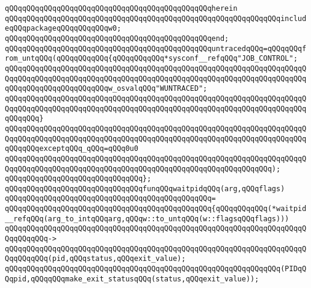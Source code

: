 \verb|qQQqqQQqqQQqqQQqqQQqqQQqqQQqqQQqqQQqqQQqqQQqqQQqherein|\newline
\verb|qQQqqQQqqQQqqQQqqQQqqQQqqQQqqQQqqQQqqQQqqQQqqQQqqQQqqQQqqQQqqQQqincludeqQQqpackageqQQqqQQqqQQqw0;|\newline
\verb|qQQqqQQqqQQqqQQqqQQqqQQqqQQqqQQqqQQqqQQqqQQqqQQqend;|\newline
\newline
\verb|qQQqqQQqqQQqqQQqqQQqqQQqqQQqqQQqqQQqqQQqqQQqqQQquntracedqQQq=qQQqqQQqfrom_untqQQq(qQQqqQQqqQQq{qQQqqQQqqQQq*sysconf__refqQQq"JOB_CONTROL";|\newline
\verb|qQQqqQQqqQQqqQQqqQQqqQQqqQQqqQQqqQQqqQQqqQQqqQQqqQQqqQQqqQQqqQQqqQQqqQQqqQQqqQQqqQQqqQQqqQQqqQQqqQQqqQQqqQQqqQQqqQQqqQQqqQQqqQQqqQQqqQQqqQQqqQQqqQQqqQQqqQQqqQQqqQQqw_osvalqQQq"WUNTRACED";|\newline
\verb|qQQqqQQqqQQqqQQqqQQqqQQqqQQqqQQqqQQqqQQqqQQqqQQqqQQqqQQqqQQqqQQqqQQqqQQqqQQqqQQqqQQqqQQqqQQqqQQqqQQqqQQqqQQqqQQqqQQqqQQqqQQqqQQqqQQqqQQqqQQqqQQqqQQq}|\newline
\verb|qQQqqQQqqQQqqQQqqQQqqQQqqQQqqQQqqQQqqQQqqQQqqQQqqQQqqQQqqQQqqQQqqQQqqQQqqQQqqQQqqQQqqQQqqQQqqQQqqQQqqQQqqQQqqQQqqQQqqQQqqQQqqQQqqQQqqQQqqQQqqQQqqQQqexceptqQQq_qQQq=qQQq0u0|\newline
\verb|qQQqqQQqqQQqqQQqqQQqqQQqqQQqqQQqqQQqqQQqqQQqqQQqqQQqqQQqqQQqqQQqqQQqqQQqqQQqqQQqqQQqqQQqqQQqqQQqqQQqqQQqqQQqqQQqqQQqqQQqqQQqqQQqqQQq);|\newline
\verb|qQQqqQQqqQQqqQQqqQQqqQQqqQQqqQQq};|\newline
\newline
\newline
\verb|qQQqqQQqqQQqqQQqqQQqqQQqqQQqqQQqfunqQQqwaitpidqQQq(arg,qQQqflags)|\newline
\verb|qQQqqQQqqQQqqQQqqQQqqQQqqQQqqQQqqQQqqQQqqQQqqQQq=|\newline
\verb|qQQqqQQqqQQqqQQqqQQqqQQqqQQqqQQqqQQqqQQqqQQqqQQq{qQQqqQQqqQQq(*waitpid__refqQQq(arg_to_intqQQqarg,qQQqw::to_untqQQq(w::flagsqQQqflags)))|\newline
\verb|qQQqqQQqqQQqqQQqqQQqqQQqqQQqqQQqqQQqqQQqqQQqqQQqqQQqqQQqqQQqqQQqqQQqqQQqqQQqqQQq->|\newline
\verb|qQQqqQQqqQQqqQQqqQQqqQQqqQQqqQQqqQQqqQQqqQQqqQQqqQQqqQQqqQQqqQQqqQQqqQQqqQQqqQQq(pid,qQQqstatus,qQQqexit_value);|\newline
\newline
\verb|qQQqqQQqqQQqqQQqqQQqqQQqqQQqqQQqqQQqqQQqqQQqqQQqqQQqqQQqqQQqqQQq(PIDqQQqpid,qQQqqQQqmake_exit_statusqQQq(status,qQQqexit_value));|\newline
